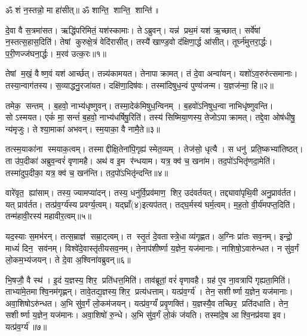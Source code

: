 \setcounter{anuvakam}{0}

ॐ शं न॒स्तन्नो॒ मा हा॑सीत्॥ ॐ शान्ति॒ शान्ति॒ शान्ति॑॥

दे॒वा वै स॒त्रमा॑सत। 
ऋद्धि॑परिमितं॒ यश॑स्कामाः। 
तेऽब्रुवन्। 
यन्न॑ प्रथ॒मं यश॑ ऋ॒च्छात्। 
सर्वे॑षां न॒स्तत्स॒हास॒दिति॑। 
तेषां कुरुक्षे॒त्रं वेदि॑रासीत्। 
तस्यै॑ खाण्ड॒वो द॑क्षिणा॒र्द्ध आ॑सीत्। 
तूर्घ्न॑मुत्तरा॒र्द्धः। 
प॒री॒णज्ज॑घना॒र्द्धः। 
म॒रव॑ उत्क॒रः॥१॥

तेषां म॒खं॒ वैष्ण॒वं यश॑ आर्च्छत्। 
तन्न्य॑कामयत। 
तेनापाक्रामत्। 
तं दे॒वा अन्वा॑यन्। 
यशो॑ऽव॒रुरु॑त्समानाः। 
तस्या॒न्वाग॑तस्य। 
स॒व्याद्धनु॒रजा॑यत। 
दक्षि॑णा॒दिष॑वः। 
तस्मा॑दिषुध॒न्वं पुण्य॑जन्म। 
य॒ज्ञज॑न्मा॒ हि॥२॥

तमेक॒ सन्तम्। 
ब॒हवो॒ नाभ्य॑धृष्णुवन्। 
तस्मा॒देक॑मिषुध॒न्वि\-नम्। 
ब॒हवो॑ऽनिषुध॒न्वा नाभिधृ॑ष्णुवन्ति। 
सोऽस्मयत। 
एकं॑ मा॒ सन्तं॑ ब॒हवो॒ नाभ्य॑धर्\mbox{}षिषु॒रिति॑। 
तस्य॑ सिष्मिया॒णस्य॒ तेजोऽपाक्रामत्। 
तद्दे॒वा ओष॑धीषु॒ न्य॑मृजुः। 
ते श्या॒माका॑ अभवन्। 
स्म॒याका॒ वै नामै॒ते॥३॥

तत्स्म॒याका॑ना स्मयाक॒त्वम्। 
तस्माद्दीक्षि॒तेना॑पि॒गृह्य॑ स्मेत॒व्यम्। 
तेज॑सो॒ धृत्यै। 
स धनु॑ प्रति॒ष्कभ्या॑तिष्ठत्। 
ता उ॑प॒दीका॑ अब्रुव॒न्वरं॑ वृणामहै। 
अथ॑ व इ॒म र॑न्धयाम। 
यत्र॒ क्व॑ च॒ खना॑म। 
तद॒पो॑ऽभितृ॑णदा॒मेति॑। 
तस्मा॑दुप॒दीका॒ यत्र॒ क्व॑ च॒ खन॑न्ति। 
तद॒पो॑ऽभितृ॑न्दन्ति॥४॥

वारे॑वृत॒ ह्या॑साम्। 
तस्य॒ ज्यामप्या॑दन्। 
तस्य॒ धनु॑र्वि॒प्रव॑माण॒ शिर॒ उद॑वर्तयत्। 
तद्द्यावा॑पृथि॒वी अनु॒प्राव॑र्तत। 
यत् प्राव॑र्तत। 
तत्प्र॑व॒र्ग्य॑स्य प्रवर्ग्य॒त्वम्। 
यद्घ्राँ(४)इत्यप॑तत्। 
तद्\mbox{}घ॒र्मस्य॑ घर्म॒त्वम्। 
म॒ह॒तो वी॒र्य॑मपप्त॒दिति॑। 
तन्म॑हावी॒रस्य॑ महावीर॒त्वम्॥५॥

यद॒स्याः स॒मभ॑रन्। 
तत्स॒म्राज्ञ॑ सम्रा॒ट्त्वम्। 
त स्तृ॒तं दे॒वतास्त्रे॒धा व्य॑गृह्णत। 
अ॒ग्निः प्रा॑तः सव॒नम्। 
इन्द्रो॒ माध्यं॑ दिन॒ सव॑नम्। 
विश्वे॑दे॒वास्तृ॑तीयसव॒नम्। 
तेनाप॑शीर्ष्णा य॒ज्ञेन॒ यज॑मानाः। 
नाशिषो॒ऽवारु॑न्धत। 
न सु॑व॒र्गं लो॒कम॒भ्य॑जयन्। 
ते दे॒वा अ॒श्विना॑वब्रुवन्॥६॥

भि॒षजौ॒ वै स्थ॑। 
इ॒दं य॒ज्ञस्य॒ शिर॒ प्रति॑धत्त॒मिति॑। 
ताव॑ब्रूतां॒ वरं॑ वृणावहै। 
ग्रह॑ ए॒व ना॒वत्रापि॑ गृह्यता॒मिति॑। 
ताभ्या॑मे॒तमाश्वि॒नम॑गृह्णन्। 
तावे॒तद्य॒ज्ञस्य॒ शिर॒ प्रत्य॑धत्ताम्। 
यत्प्र॑व॒र्ग्य॑। 
तेन॒ सशीर्ष्णा य॒ज्ञेन॒ यज॑मानाः। 
अवा॒शिषो\-ऽरु॑न्धत। 
अ॒भि सु॑व॒र्गं लो॒कम॑जयन्। 
यत्प्र॑व॒र्ग्यं॑ प्रवृ॒णक्ति॑। 
य॒ज्ञस्यै॒व तच्छिर॒ प्रति॑दधाति। 
तेन॒ सशीर्ष्णा य॒ज्ञेन॒ यज॑मानः। 
अवा॒शिषो॑ रु॒न्धे। 
अ॒भि सु॑व॒र्गं लो॒कं ज॑यति। 
तस्मा॑दे॒ष आश्वि॒नप्र॑वया इव। 
यत्प्र॑व॒र्ग्य॑॥७॥
\anuvakamend[उ॒त्क॒रो ह्ये॑ते तृ॑न्दन्ति महावीर॒त्वम॑ब्रुवन्नजयन्त्स॒प्त च॑]

